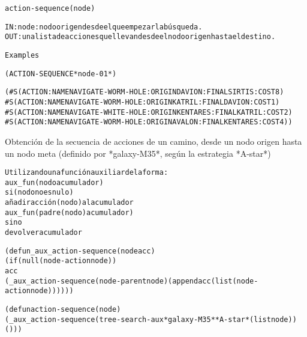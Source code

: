 \begin{aibox}{\function}
\begin{alltt}
 action-sequence (node)


IN:  node: nodo origen desde el que empezar la búsqueda.
OUT: una lista de acciones que llevan desde el nodo origen hasta el destino.

\end{alltt}
\end{aibox}

\begin{aibox}{\examples}
\begin{alltt}
Examples

(ACTION-SEQUENCE *node-01*)

(\#S(ACTION :NAME NAVIGATE-WORM-HOLE :ORIGIN DAVION :FINAL SIRTIS :COST 8)
 \#S(ACTION :NAME NAVIGATE-WORM-HOLE :ORIGIN KATRIL :FINAL DAVION :COST 1)
 \#S(ACTION :NAME NAVIGATE-WHITE-HOLE :ORIGIN KENTARES :FINAL KATRIL :COST 2)
 \#S(ACTION :NAME NAVIGATE-WORM-HOLE :ORIGIN AVALON :FINAL KENTARES :COST 4))


\end{alltt}
\end{aibox}

\begin{aibox}{\comments}
Obtención de la secuencia de acciones de un camino, desde un nodo origen hasta un nodo meta
    (definido por *galaxy-M35*, según la estrategia *A-star*)


\end{aibox}

\begin{aibox}{\pseudocode}
\begin{alltt}
Utilizando una función auxiliar de la forma:
aux\_fun (nodo acumulador)
       si (nodo no es nulo)
           añadir acción(nodo) al acumulador
           aux\_fun(padre(nodo) acumulador)
       sino
           devolver acumulador

\end{alltt}
\end{aibox}

\begin{aibox}{\code}
\begin{alltt}
(defun  \_aux\_action-sequence (node acc)
    (if (null (node-action node))
        acc
        (\_aux\_action-sequence (node-parent node) (append acc (list (node-action node))))))

(defun  action-sequence (node)
    (\_aux\_action-sequence (tree-search-aux *galaxy-M35* *A-star* (list node)) ()))




\end{alltt}
\end{aibox}
